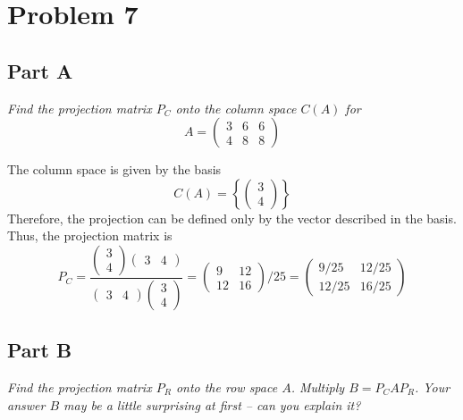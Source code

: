 \documentclass{article}
\begin{document}
\section*{Problem 7}

\subsection*{Part A}

\textit{Find the projection matrix $P_C$ onto the column space $C(A)$ for}
$$ A = \begin{pmatrix}
    3 & 6 & 6 \\
    4 & 8 & 8
\end{pmatrix} $$

\bigbreak

The column space is given by the basis
$$ C(A) = \left\{ \begin{pmatrix}
    3 \\
    4
\end{pmatrix} \right\} $$
Therefore, the projection can be defined only by the vector described in the
basis. Thus, the projection matrix is
$$ P_C = \frac{\begin{pmatrix} 3 \\ 4 \end{pmatrix} \begin{pmatrix} 3 & 4
\end{pmatrix}}{\begin{pmatrix} 3 & 4 \end{pmatrix} \begin{pmatrix} 3 \\ 4
\end{pmatrix}} = \begin{pmatrix}
    9 & 12 \\
    12 & 16
\end{pmatrix} / 25 = \begin{pmatrix}
    9/25 & 12/25 \\
    12/25 & 16/25
\end{pmatrix} $$

\subsection*{Part B}

\textit{Find the projection matrix $P_R$ onto the row space $A$. Multiply $B
= P_C A P_R$. Your answer $B$ may be a little surprising at first -- can you
explain it?}

\bigbreak
\end{document}
